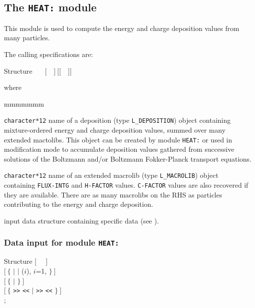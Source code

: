 \subsection{The {\tt HEAT:} module}\label{sect:HEATData}

This module is used to compute the energy and charge deposition values from many particles.

\vskip 0.02cm

The calling specifications are:

\begin{DataStructure}{Structure }
~\moc{:=}~~$[$~~$]~[[$~~$]]$ \moc{::}  \\
\end{DataStructure}

\noindent where
\begin{ListeDeDescription}{mmmmmmm}

\item[\dusa{DEPOS}] {\tt character*12} name of a {\sc deposition} (type {\tt L\_DEPOSITION}) object containing mixture-ordered energy and charge deposition values, summed over many extended mactolibs. This object can be created by module {\tt HEAT:} or used in modification mode to
accumulate deposition values gathered from successive solutions of the Boltzmann and/or Boltzmann Fokker-Planck transport equations.

\item[\dusa{MACRO}] {\tt character*12} name of an extended {\sc macrolib} (type {\tt L\_MACROLIB}) object containing {\tt FLUX-INTG} and {\tt H-FACTOR} values.
{\tt C-FACTOR} values are also recovered if they are available. There are as many macrolibs on the RHS as particles contributing to the energy and charge deposition.

\item[\dusa{HEAT\_data}] input data structure containing specific data (see ).

\end{ListeDeDescription}

\subsubsection{Data input for module {\tt HEAT:}}\label{sect:descHEAT}

\vskip -0.5cm

\begin{DataStructure}{Structure }
$[$~ ~$]$ \\
$[~\{$   $|$   $|$  ($i$), $i$=1, $\}~]$ \\
$[~\{$  $|$  $\}~]$ \\
$[~\{$   {\tt >>}  {\tt <<} $|$   {\tt >>}  {\tt <<} $\}~]$ \\
;
\end{DataStructure}

